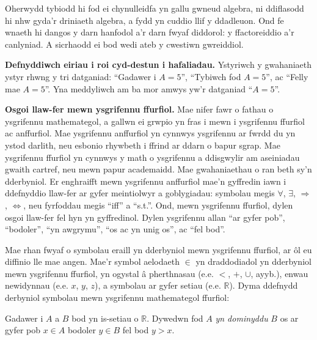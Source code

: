 \documentclass{article}
\begin{document}
\begin{multicols}{2}
Oherwydd tybiodd hi fod ei chynulleidfa yn gallu gwneud algebra, ni ddiflasodd
hi nhw gyda'r driniaeth algebra, a fydd yn cuddio llif y ddadleuon.
Ond fe wnaeth hi dangos y darn hanfodol a'r darn fwyaf diddorol: y ffactoreiddio
a'r canlyniad.
A sicrhaodd ei bod wedi ateb y cwestiwn gwreiddiol.

\vspace{4mm}

\textbf{Defnyddiwch eiriau i roi cyd-destun i hafaliadau.}
Ystyriwch y gwahaniaeth ystyr rhwng y tri datganiad: ``Gadawer i $A = 5$'',
``Tybiwch fod $A = 5$'', ac ``Felly mae $A = 5$''.
Yna meddyliwch am ba mor amwys yw'r datganiad ``$A = 5$''.

\vspace{4mm}

\textbf{Osgoi llaw-fer mewn ysgrifennu ffurfiol.}
Mae nifer fawr o fathau o ysgrifennu mathemategol, a gallwn ei grwpio yn fras i
mewn i ysgrifennu ffurfiol ac anffurfiol.
Mae ysgrifennu anffurfiol yn cynnwys ysgrifennu ar fwrdd du yn ystod darlith,
neu esbonio rhywbeth i ffrind ar ddarn o bapur sgrap.
Mae ysgrifennu ffurfiol yn cynnwys y math o ysgrifennu a ddisgwylir am
aseiniadau gwaith cartref, neu mewn papur academaidd.
Mae gwahaniaethau o ran beth sy'n dderbyniol.
Er enghraifft mewn ysgrifennu anffurfiol mae'n gyffredin iawn i ddefnyddio
llaw-fer ar gyfer meintiolwyr a goblygiadau: symbolau megis $\forall$,
$\exists$, $\Rightarrow$, $\Leftrightarrow$, neu fyrfoddau megis ``iff'' a
``s.t.''.
Ond, mewn ysgrifennu ffurfiol, dylen osgoi llaw-fer fel hyn yn gyffredinol.
Dylen ysgrifennu allan ``ar gyfer pob'', ``bodoler'', ``yn awgrymu'', ``os ac yn
unig os'', ac ``fel bod''.

Mae rhan fwyaf o symbolau eraill yn dderbyniol mewn ysgrifennu ffurfiol, ar
\^{o}l eu diffinio lle mae angen.
Mae'r symbol aelodaeth $\in$ yn draddodiadol yn dderbyniol mewn ysgrifennu
ffurfiol, yn ogystal \^{a} pherthnasau (e.e. $<$, $+$, $\cup$, ayyb.), enwau
newidynnau (e.e. $x$, $y$, $z$), a symbolau ar gyfer setiau (e.e. $\mathbb{R}$).
Dyma ddefnydd derbyniol symbolau mewn ysgrifennu mathemategol ffurfiol:

\setlength{\leftskip}{0.7cm}

Gadawer i $A$ a $B$ bod yn is-setiau o $\mathbb{R}$.
Dywedwn fod $A$ \textit{yn dominyddu} $B$ os ar gyfer pob $x \in A$ bodoler
$y \in B$ fel bod $y > x$.

\setlength{\leftskip}{0pt}

\vspace{4mm}


\end{multicols}
\end{document}
